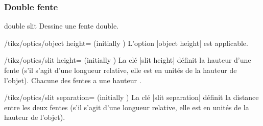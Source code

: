 \documentclass[a4paper]{ltxdoc}
\begin{document}
\subsubsection{Double fente}


\begin{shape}{double slit}
Dessine une fente double.

\begin{codeexample}[width=5cm]
\end{codeexample}

\begin{key}{/tikz/optics/object height= (initially )}
    L'option |object height| est applicable.
\end{key}


\begin{key}{/tikz/optics/slit height= (initially )}
La clé |slit height| définit la hauteur d'une fente (s'il s'agit d'une longueur relative, elle est en unités de la hauteur de l'objet).
Chacune des fentes a une hauteur .

\begin{codeexample}[width=5cm]
\end{codeexample}
\end{key}

\begin{key}{/tikz/optics/slit separation= (initially )}
La clé |slit separation| définit la distance entre les deux fentes (s'il s'agit d'une longueur relative, elle est en unités de la hauteur de l'objet).

\begin{codeexample}[width=5cm]
\end{codeexample}
\end{key}




\end{shape}
\end{document}

